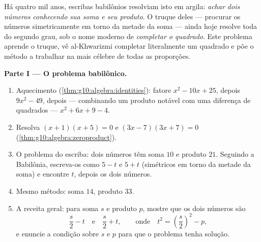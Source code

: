 \begin{problem}[{Problema de fim de semana --- problemas de soma e
produto, completar o quadrado como al-Khwarizmi o desenhou, e a
equação $x^2 = x + 1$}]
\label{pb:g10:algebra:1}
Há quatro mil anos, escribas babilônios resolviam isto em argila:
\emph{achar dois números conhecendo sua soma e seu produto}. O truque
deles --- procurar os números simetricamente em torno da metade da
soma --- ainda hoje resolve toda  do segundo grau, sob o nome
moderno de \emph{completar o quadrado}. Este problema aprende o truque,
vê al-Khwarizmi completar literalmente um quadrado e põe o método a
trabalhar na mais célebre de todas as proporções.

\medskip
\noindent\textbf{Parte I --- O problema babilônico.}
\begin{enumerate}
  \item Aquecimento (\cref{thm:g10:algebra:identities}): fatore
        $x^2 - 10x + 25$, depois $9x^2 - 49$, depois --- combinando
        um produto notável com uma diferença de quadrados ---
        $x^2 + 6x + 9 - 4$.
  \item Resolva $(x + 1)(x + 5) = 0$ e
        $(3x - 7)(3x + 7) = 0$
        (\cref{thm:g10:algebra:zeroproduct}).
  \item O problema do escriba: dois números têm soma $10$ e
        produto $21$. Seguindo a Babilônia, escreva-os como
        $5 - t$ e $5 + t$ (simétricos em torno da metade da soma)
        e encontre $t$, depois os dois números.
  \item Mesmo método: soma $14$, produto $33$.
  \item A receita geral: para soma $s$ e produto $p$, mostre que
        os dois números são
        \[
        \frac s2 - t
        \quad\text{e}\quad
        \frac s2 + t,
        \qquad\text{onde}\quad
        t^2 = \left(\frac s2\right)^2 - p ,
        \]
        e enuncie a condição sobre $s$ e $p$ para que o problema
        tenha solução.
\end{enumerate}


\end{problem}
